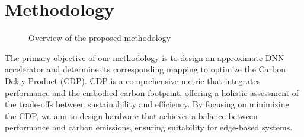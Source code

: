 \vspace{-3pt}
\section{Methodology}\label{sec:methodology}
\vspace{-3pt}
\begin{figure}
    \centering
    \caption{Overview of the proposed methodology}
    \vspace{-10pt}
    \label{fig:overview}
\end{figure}



The primary objective of our methodology is to design an approximate DNN accelerator and determine its corresponding mapping to optimize the Carbon Delay Product (CDP). CDP is a comprehensive metric that integrates performance and the embodied carbon footprint, offering a holistic assessment of the trade-offs between sustainability and efficiency.
By focusing on minimizing the CDP, we aim to design hardware that achieves a balance between performance and carbon emissions, ensuring suitability for edge-based systems.


